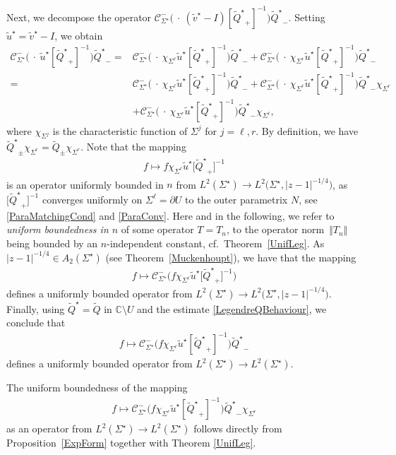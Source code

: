 \documentclass[11pt]{article}
\numberwithin{equation}{section}
\newcommand{\C}{\mathbb{C}}
\newcommand{\Id}{I}
\newcommand{\tQ}{{\widetilde Q}}
\newcommand{\stQ}{{\widetilde Q^\star}}
\newcommand{\stv}{{\widetilde v^\star}}
\newcommand{\stu}{{\widetilde u^\star}}
\newcommand{\sCau}{\mathcal C_{\Sigma^\star}}
\newcommand{\Sigl}{\Sigma^\ell}
\newcommand{\Sigr}{\Sigma^r}
\numberwithin{equation}{section}
\begin{document}
Next, we decompose the operator $\sCau^-\big(\ \cdot \ (\stv-\Id) [\stQ_+]^{-1}\big)\stQ_-$. Setting $\stu = \stv-\Id$, we obtain
\begin{align*}
 \sCau^-\big(\ \cdot \ \stu [\stQ_+]^{-1}\big)\stQ_- ={}&
 \sCau^-\big(\ \cdot \ \chi_{\Sigl} \stu [\stQ_+]^{-1}\big)\stQ_- + \sCau^-\big(\ \cdot \ \chi_{\Sigr} \stu [\stQ_+]^{-1}\big)\stQ_-
 \\
 ={}& \sCau^-\big(\ \cdot \ \chi_{\Sigl} \stu [\stQ_+]^{-1}\big)\stQ_- + \sCau^-\big(\ \cdot \ \chi_{\Sigr} \stu [\stQ_+]^{-1}\big)\stQ_-\chi_{\Sigr}
 \\
 & + \sCau^-\big(\ \cdot \ \chi_{\Sigr} \stu [\stQ_+]^{-1}\big)\stQ_-\chi_{\Sigl},
\end{align*}
where $\chi_{\Sigma^j}$ is the characteristic function of $\Sigma^j$ for $j = \ell, r$. By definition, we have $\stQ_\pm \chi_{\Sigma^r} = \tQ_\pm \chi_{\Sigma^r}$. Note that the mapping
\begin{align*}
f \mapsto f\chi_{\Sigl} \stu \big[\stQ_+\big]^{-1}
\end{align*}
is an operator uniformly bounded in $n$ from $L^2(\Sigma^\star) \to L^2\big(\Sigma^\star, |z-1|^{-1/4}\big)$, as $\big[\stQ_+\big]^{-1}$ converges uniformly on $\Sigl = \partial U$ to the outer parametrix $N$, see \eqref{ParaMatchingCond} and \eqref{ParaConv}. Here and in the following, we refer to \emph{uniform boundedness in $n$} of some operator $T = T_n$, to the operator norm~$\Vert T_n \Vert$ being bounded by an $n$-independent constant, cf.\ Theorem~\ref{UnifLeg}. As $|z-1|^{-1/4} \in A_2(\Sigma^\star)$ (see Theorem~\ref{Muckenhoupt}), we have that the mapping
\begin{align*}
 f \mapsto \sCau^{-}\big(f\chi_{\Sigl} \stu \big[\stQ_+\big]^{-1}\big)
\end{align*}
defines a uniformly bounded operator from $L^2(\Sigma^\star) \to L^2\big(\Sigma^\star, |z-1|^{-1/4}\big)$. Finally, using $\stQ = \tQ$ in $\C \setminus U$ and the estimate \eqref{LegendreQBehaviour}, we conclude that
\begin{align*}
 f \mapsto \sCau^{-}\big(f\chi_{\Sigl} \stu [\stQ_+]^{-1}\big)\stQ_-
\end{align*}
defines a uniformly bounded operator from $L^2(\Sigma^\star) \to L^2(\Sigma^\star)$.

The uniform boundedness of the mapping
\begin{align*}
 f \mapsto \sCau^-\big(f\chi_{\Sigr} \stu [\stQ_+]^{-1}\big)\stQ_-\chi_{\Sigr}
\end{align*}
as an operator from $L^2(\Sigma^\star) \to L^2(\Sigma^\star)$ follows directly from Proposition~\ref{ExpForm} together with Theorem \ref{UnifLeg}.
\end{document}
